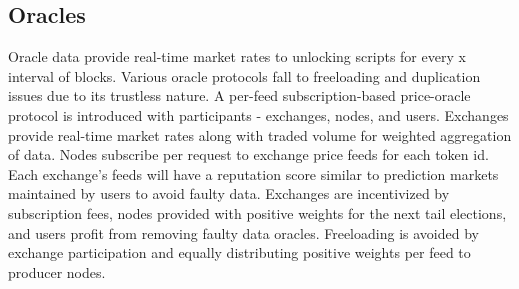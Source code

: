 \documentclass[../Bitcoin Blink.tex]{subfiles}
\begin{document}
\subsection{Oracles}

Oracle data provide real-time market rates to unlocking scripts for every x interval of blocks. Various oracle protocols \cite{chainlink} fall to freeloading and duplication issues due to its trustless nature. A per-feed subscription-based price-oracle protocol is introduced with participants - exchanges, nodes, and users. Exchanges provide real-time market rates along with traded volume for weighted aggregation of data. Nodes subscribe per request to exchange price feeds for each token id. Each exchange's feeds will have a reputation score similar to prediction markets maintained by users to avoid faulty data. Exchanges are incentivized by subscription fees, nodes provided with positive weights for the next tail elections, and users profit from removing faulty data oracles. Freeloading is avoided by exchange participation and equally distributing positive weights per feed to producer nodes. 
\end{document}
